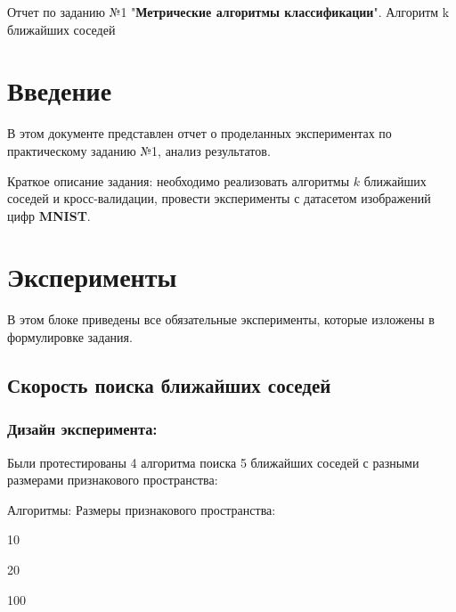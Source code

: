 \documentclass[a4paper, 11pt]{article}
\begin{document}
    \center \Large Отчет по заданию №1 "\textbf{Метрические алгоритмы классификации}". Алгоритм k ближайших соседей
    \tableofcontents
    
    \newpage
    \section{Введение}
    В этом документе представлен отчет о проделанных экспериментах по практическому заданию №1, анализ результатов. 
    
    Краткое описание задания: необходимо реализовать алгоритмы $k$ ближайших соседей и кросс-валидации, провести эксперименты с датасетом изображений цифр \textbf{MNIST}.
    
    
    \section{Эксперименты}
    В этом блоке приведены все обязательные эксперименты, которые изложены в формулировке задания.
    \subsection{Скорость поиска ближайших соседей}
    \subsubsection{Дизайн эксперимента:}
    Были протестированы 4 алгоритма поиска 5 ближайших соседей с разными размерами признакового пространства:
    
    Алгоритмы: \hspace{15em} Размеры признакового пространства: %
    \begin{itemize}
        \begin{multicols}{2}
            \item {}
            \item {}
            \item {}
            \item {}
            \item 10
            \item 20
            \item 100
        \end{multicols}
    \end{itemize}
\end{document}

